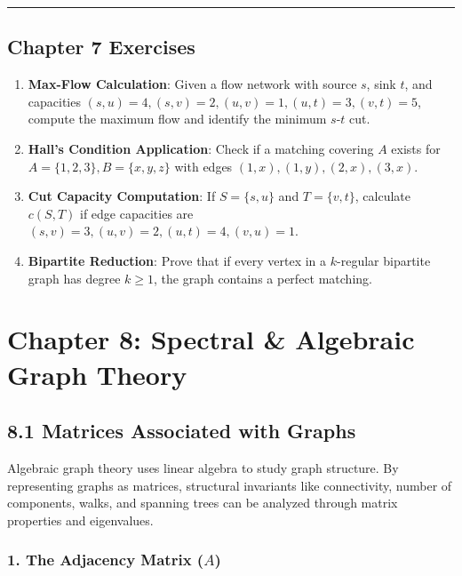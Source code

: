 \documentclass[
]{book}
\providecommand{\tightlist}{%
  \setlength{\itemsep}{0pt}\setlength{\parskip}{0pt}}
\theoremstyle{definition}
\theoremstyle{definition}
\theoremstyle{definition}
\theoremstyle{definition}
\theoremstyle{remark}
\begin{document}
\begin{center}\rule{0.5\linewidth}{0.5pt}\end{center}

\section{Chapter 7 Exercises}\label{chapter-7-exercises}

\begin{enumerate}
\def\labelenumi{\arabic{enumi}.}
\tightlist
\item
  \textbf{Max-Flow Calculation}: Given a flow network with source \(s\), sink \(t\), and capacities \((s,u)=4, (s,v)=2, (u,v)=1, (u,t)=3, (v,t)=5\), compute the maximum flow and identify the minimum \(s\)-\(t\) cut.
\item
  \textbf{Hall's Condition Application}: Check if a matching covering \(A\) exists for \(A = \{1, 2, 3\}, B = \{x, y, z\}\) with edges \((1,x), (1,y), (2,x), (3,x)\).
\item
  \textbf{Cut Capacity Computation}: If \(S = \{s, u\}\) and \(T = \{v, t\}\), calculate \(c(S, T)\) if edge capacities are \((s,v)=3, (u,v)=2, (u,t)=4, (v,u)=1\).
\item
  \textbf{Bipartite Reduction}: Prove that if every vertex in a \(k\)-regular bipartite graph has degree \(k \ge 1\), the graph contains a perfect matching.
\end{enumerate}

\chapter{Chapter 8: Spectral \& Algebraic Graph Theory}\label{chapter-8-spectral-algebraic-graph-theory}

\section{8.1 Matrices Associated with Graphs}\label{matrices-associated-with-graphs}

Algebraic graph theory uses linear algebra to study graph structure. By representing graphs as matrices, structural invariants like connectivity, number of components, walks, and spanning trees can be analyzed through matrix properties and eigenvalues.

\subsection{\texorpdfstring{1. The Adjacency Matrix (\(A\))}{1. The Adjacency Matrix (A)}}\label{the-adjacency-matrix-a-1}
\end{document}
